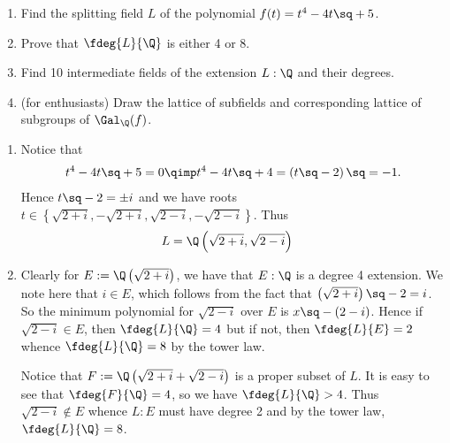 \documentclass{article}
\begin{document}
\begin{exercise}
  \begin{enumerate}[label=(\alph*)]
    \item Find the splitting field \( L \) of the polynomial \( f(t) = t^4 - 4t\sq + 5 \).
    \item Prove that \( \fdeg{L}{\Q} \) is either 4 or 8.
    \item Find 10 intermediate fields of the extension \( L:\Q \) and their degrees.
    \item (for enthusiasts) Draw the lattice of subfields and corresponding lattice of subgroups of \( \Gal_\Q(f) \).
  \end{enumerate}
\end{exercise}
\begin{enumerate}[label=(\alph*)]
  \item \begin{solution}
    Notice that \begin{align*}
      t^4 - 4t\sq + 5 = 0 \qimp t^4 - 4t\sq + 4 = \left( t\sq - 2 \right)\sq = -1.
    \end{align*}
    Hence \( t\sq - 2 = \pm i \) and we have roots \( t \in \left\{ \sqrt{2+i},-\sqrt{2+i},\sqrt{2-i},-\sqrt{2-i} \right\} \).
    Thus \begin{align*}
      L &= \Q\left( \sqrt{2+i},\sqrt{2-i} \right)
    \end{align*}
  \end{solution}

  \item \begin{solution}
    Clearly for \( E:= \Q\left(\sqrt{2+i}\right) \), we have that \( E:\Q \) is a degree 4 extension.
    We note here that \( i \in E \), which follows from the fact that \( \left( \sqrt{2+i} \right)\sq-2 = i \).
    So the minimum polynomial for \( \sqrt{2-i} \) over \( E \) is \( x\sq-(2-i) \).
    Hence if \( \sqrt{2-i}\in E \), then \( \fdeg{L}{\Q}=4 \) but if not, then \( \fdeg{L}{E}=2 \) whence \( \fdeg{L}{\Q}=8 \) by the tower law.

    Notice that \( F:= \Q\left( \sqrt{2+i}+\sqrt{2-i} \right) \) is a proper subset of \( L \).
    It is easy to see that \( \fdeg{F}{\Q}=4 \), so we have \( \fdeg{L}{\Q}>4 \).
    Thus \( \sqrt{2-i}\not\in E \) whence \( L:E \) must have degree 2 and by the tower law, \( \fdeg{L}{\Q} = 8 \).
  \end{solution}


\end{enumerate}
\end{document}
